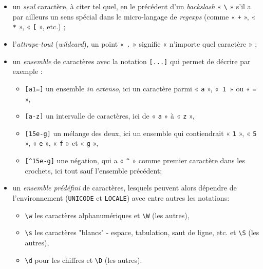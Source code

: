 \begin{itemize}
\item un \emph{seul} caractère, à citer tel quel, en le précédent d'un \textit{backslash} « \texttt{\textbackslash} » s'il a par ailleurs un sens spécial dans le micro-langage de \textit{regexps} (comme « \texttt{+} », « \texttt{*} », « \texttt{[} », etc.) ;
\item l'\emph{attrape-tout} (\textit{wildcard}), un point « \texttt{.} » signifie « n'importe quel caractère » ;
\item un \emph{ensemble} de caractères avec la notation \texttt{[...]} qui permet de décrire par exemple :
	\begin{itemize}\jazzitem
	\item \lstinline[basicstyle={\small\shellttfont}]{[a1=]} un ensemble \textit{in extenso}, ici un caractère parmi « \texttt{a} », «~\texttt{1}~» ou « \texttt{=} »,
	\item \lstinline[basicstyle={\small\shellttfont}]{[a-z]} un intervalle de caractères, ici de « \texttt{a} » à « \texttt{z} »,
	\item \lstinline[basicstyle={\small\shellttfont}]{[15e-g]} un mélange des deux, ici un ensemble qui contiendrait « \texttt{1} », « \texttt{5} », « \texttt{e} », « \texttt{f} » et « \texttt{g} »,
	\item \lstinline[basicstyle={\small\shellttfont}]{[^15e-g]} une négation, qui a « \texttt{\textasciicircum{}} » comme premier caractère dans les crochets, ici tout sauf l'ensemble précédent;
	\end{itemize}
\item un \emph{ensemble prédéfini} de caractères, lesquels peuvent alors dépendre de l'environnement (\texttt{UNICODE} et \texttt{LOCALE}) avec entre autres les notations:
	\begin{itemize}\jazzitem
	\item \lstinline[basicstyle={\small\shellttfont}]{\w} les caractères alphanumériques et \lstinline[basicstyle={\small\shellttfont}]{\W} (les autres),
	\item \lstinline[basicstyle={\small\shellttfont}]{\s} les caractères "blancs" - espace, tabulation, saut de ligne, etc. et \lstinline[basicstyle={\small\shellttfont}]{\S} (les autres),
	\item \lstinline[basicstyle={\small\shellttfont}]{\d} pour les chiffres et \lstinline[basicstyle={\small\shellttfont}]{\D} (les autres).
	\end{itemize}
\end{itemize}


